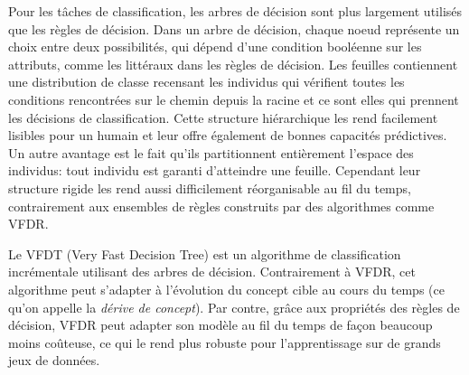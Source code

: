         Pour les tâches de classification, les arbres de décision sont plus largement utilisés que les règles de décision. Dans un arbre de décision, chaque noeud représente un choix entre deux possibilités, qui dépend d'une condition booléenne sur les attributs, comme les littéraux dans les règles de décision. Les feuilles contiennent une distribution de classe recensant les individus qui vérifient toutes les conditions rencontrées sur le chemin depuis la racine et ce sont elles qui prennent les décisions de classification. Cette structure hiérarchique les rend facilement lisibles pour un humain et leur offre également de bonnes capacités prédictives. Un autre avantage est le fait qu'ils partitionnent entièrement l'espace des individus: tout individu est garanti d'atteindre une feuille. Cependant leur structure rigide les rend aussi difficilement réorganisable au fil du temps, contrairement aux ensembles de règles construits par des algorithmes comme VFDR.
        
        Le VFDT (Very Fast Decision Tree) est un algorithme de classification incrémentale utilisant des arbres de décision. Contrairement à VFDR, cet algorithme peut s’adapter à l’évolution du concept cible au cours du temps (ce qu'on appelle la \emph{dérive de concept}). Par contre, grâce aux propriétés des règles de décision, VFDR peut adapter son modèle au fil du temps de façon beaucoup moins coûteuse, ce qui le rend plus robuste pour l'apprentissage sur de grands jeux de données.